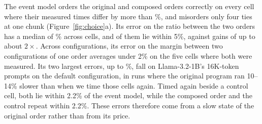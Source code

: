 \label{subsec:accuracy}

The event model orders the original and composed orders correctly on every cell where their measured times differ by more than \AccMisorderMax\%, and misorders only four ties at one chunk (Figure~\ref{fig:choice}a).
Its error on the ratio between the two orders has a median of \AccDiffMed\% across \AccCells{} cells, and \AccWithinFive{} of them lie within 5\%, against gains of up to about $2\times$.
Across configurations, its error on the margin between two configurations of one order averages under 2\% on the five cells where both were measured.
Its two largest errors, up to \AccDiffMax\%, fall on Llama-3.2-1B's 16K-token prompts on the default configuration, in runs where the original program ran 10--14\% slower than when we time those cells again.
Timed again beside a control cell, both lie within 2.2\% of the event model, while the composed order and the control repeat within 2.2\%.
These errors therefore come from a slow state of the original order rather than from its price.

